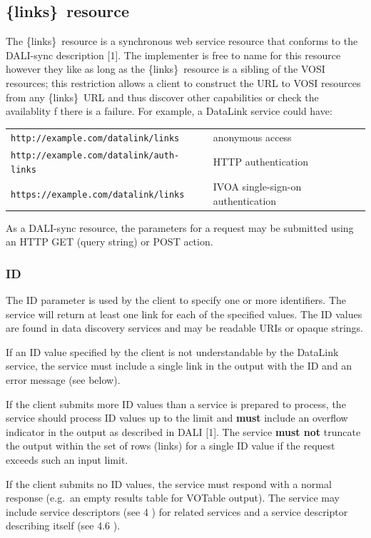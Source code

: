 \documentclass[11pt,a4paper]{ivoa}
\newcommand{\blinks}{\{links\}}
\begin{document}
\subsection{\blinks\ resource}

The \blinks\ resource is a synchronous web service resource that conforms
to the DALI-sync description [1]. The implementer is free to name for this
resource however they like as long as the \blinks\ resource is a sibling
of the VOSI resources; this restriction allows a client to construct
the URL to VOSI resources from any \blinks\ URL and thus discover other
capabilities or check the availablity f there is a failure. For example,
a DataLink service could have:

\hspace*{2em}
\begin{tabular}{l@{---}l}
\nolinkurl{http://example.com/datalink/links}
    & anonymous access \\
\nolinkurl{http://example.com/datalink/auth-links}
    & HTTP authentication \\
\nolinkurl{https://example.com/datalink/links}
    & IVOA single-sign-on authentication
\end{tabular}

As a DALI-sync resource, the parameters for a request may be submitted
using an HTTP GET (query string) or POST action.


\subsubsection{ID}

The ID parameter is used by the client to specify one or more
identifiers. The service will return at least one link for each of the
specified values. The ID values are found in data discovery services
and may be readable URIs or opaque strings.

If an ID value specified by the client is not understandable by the
DataLink service, the service must include a single link in the output
with the ID and an error message (see below).

If the client submits more ID values than a service is prepared to
process, the service should process ID values up to the limit and
{\bf must} include an overflow indicator in the output
as described in DALI [1].
The service {\bf must not} truncate the output within the set of rows
(links) for a single ID value if the request exceeds such an input limit.

If the client submits no ID values, the service must respond with a
normal response (e.g.\ an empty results table for VOTable output). The
service may include service descriptors (see 4 ) for related services
and a service descriptor describing itself (see 4.6 ).
\end{document}
